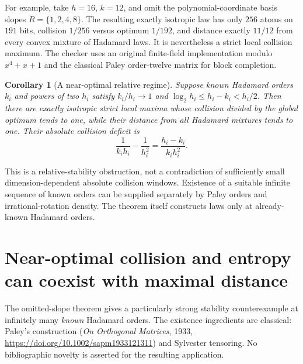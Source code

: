 \documentclass[11pt]{article}
\newtheorem{corollary}[theorem]{Corollary}
\begin{document}
For example, take $h=16$, $k=12$, and omit the polynomial-coordinate
basis slopes $R=\{1,2,4,8\}$. The resulting exactly isotropic law has
only $256$ atoms on $191$ bits, collision $1/256$ versus optimum $1/192$,
and distance exactly $11/12$ from every convex mixture of Hadamard laws.
It is nevertheless a strict local collision maximum. The checker uses
an original finite-field implementation modulo $x^4+x+1$ and the
classical Paley order-twelve matrix for block completion.

\begin{corollary}[A near-optimal relative regime]
\label{cor:design-relative-regime}
Suppose known Hadamard orders $k_i$ and powers of two $h_i$ satisfy
$k_i/h_i\to1$ and
$\log_2h_i\le h_i-k_i<h_i/2$.
Then there are exactly isotropic strict local maxima whose collision
divided by the global optimum tends to one, while their distance from
all Hadamard mixtures tends to one.
Their absolute collision deficit is
\[
 \frac1{k_i h_i}-\frac1{h_i^2}
 =\frac{h_i-k_i}{k_i h_i^2}.
\]
\end{corollary}
This is a relative-stability obstruction, not a contradiction of
sufficiently small dimension-dependent absolute collision windows.
Existence of a suitable infinite sequence of known orders can be
supplied separately by Paley orders and irrational-rotation density.
The theorem itself constructs laws only at already-known Hadamard orders.
\section{Near-optimal collision and entropy can coexist with maximal distance}
\label{sec:relative-sequence}

The omitted-slope theorem gives a particularly strong stability
counterexample at infinitely many \emph{known} Hadamard orders.
The existence ingredients are classical: Paley's construction
(\emph{On Orthogonal Matrices}, 1933,
\url{https://doi.org/10.1002/sapm1933121311}) and Sylvester tensoring.
No bibliographic novelty is asserted for the resulting application.
\end{document}
